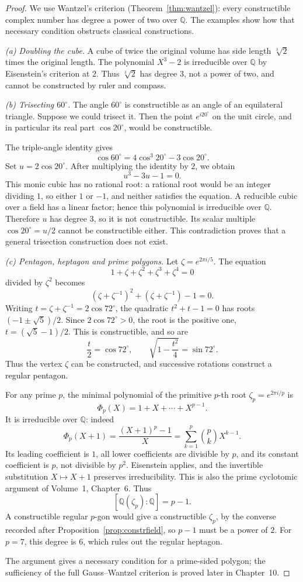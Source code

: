 \begin{proof}
We use Wantzel's criterion
(Theorem~\ref{thm:wantzel}): every
constructible complex number has
degree a power of two over $\mathbb Q$.
The examples show how that necessary
condition obstructs classical constructions.

\emph{(a) Doubling the cube.}
A cube of twice the original volume
has side length $\sqrt[3]2$ times
the original length. The polynomial
$X^3-2$ is irreducible over $\mathbb Q$
by Eisenstein's criterion at $2$.
Thus $\sqrt[3]2$ has degree $3$,
not a power of two, and cannot
be constructed by ruler and compass.

\emph{(b) Trisecting $60^\circ$.}
The angle $60^\circ$ is constructible
as an angle of an equilateral triangle.
Suppose we could trisect it. Then
the point $e^{i20^\circ}$ on the unit
circle, and in particular its real
part $\cos20^\circ$, would be constructible.

The triple-angle identity gives
\[
\cos60^\circ
=4\cos^3 20^\circ-3\cos20^\circ.
\]
Set $u=2\cos20^\circ$. After
multiplying the identity by $2$,
we obtain
\[
u^3-3u-1=0.
\]
This monic cubic has no rational root:
a rational root would be an integer
dividing $1$, so either $1$ or $-1$,
and neither satisfies the equation.
A reducible cubic over a field has
a linear factor; hence this polynomial
is irreducible over $\mathbb Q$.
Therefore $u$ has degree $3$,
so it is not constructible. Its
scalar multiple $\cos20^\circ=u/2$
cannot be constructible either.
This contradiction proves that
a general trisection construction
does not exist.

\emph{(c) Pentagon, heptagon and prime polygons.}
Let $\zeta=e^{2\pi i/5}$. The equation
\[
1+\zeta+\zeta^2+\zeta^3+\zeta^4=0
\]
divided by $\zeta^2$ becomes
\[
(\zeta+\zeta^{-1})^2+
(\zeta+\zeta^{-1})-1=0.
\]
Writing $t=\zeta+\zeta^{-1}=2\cos72^\circ$,
the quadratic $t^2+t-1=0$ has roots $(-1\pm\sqrt5)/2$.
Since $2\cos72^\circ>0$, the root is the positive one, $t=(\sqrt5-1)/2$.
This is constructible, and so are
\[
\frac t2=\cos72^\circ,\qquad
\sqrt{1-\frac{t^2}4}=\sin72^\circ.
\]
Thus the vertex $\zeta$ can be constructed,
and successive rotations construct a
regular pentagon.

For any prime $p$, the minimal polynomial
of the primitive $p$-th root
$\zeta_p=e^{2\pi i/p}$ is
\[
\Phi_p(X)=1+X+\cdots+X^{p-1}.
\]
It is irreducible over $\mathbb Q$: indeed
\[
\Phi_p(X+1)=\frac{(X+1)^p-1}{X}
=\sum_{k=1}^p\binom pk X^{k-1}.
\]
Its leading coefficient is $1$, all lower coefficients are divisible
by $p$, and its constant coefficient is $p$, not divisible by $p^2$.
Eisenstein applies, and the invertible substitution $X\mapsto X+1$
preserves irreducibility. This is also the prime cyclotomic argument
of Volume~1, Chapter~6. Thus
\[
[\mathbb Q(\zeta_p):\mathbb Q]=p-1.
\]
A constructible regular $p$-gon
would give a constructible $\zeta_p$, by the converse recorded after Proposition~\ref{prop:constrfield},
so $p-1$ must be a power of $2$.
For $p=7$, this degree is $6$,
which rules out the regular heptagon.

The argument gives a necessary condition
for a prime-sided polygon; the sufficiency
of the full Gauss--Wantzel criterion is
proved later in Chapter~10.
\end{proof}


